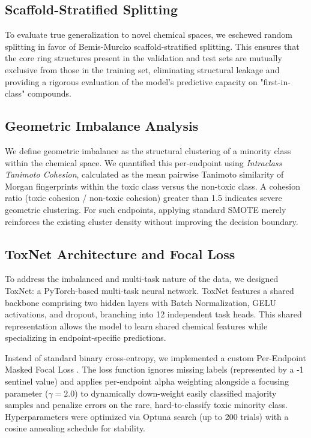 \documentclass[lettersize,journal]{IEEEtran}
\begin{document}
\subsection{Scaffold-Stratified Splitting}
To evaluate true generalization to novel chemical spaces, we eschewed random splitting in favor of Bemis-Murcko scaffold-stratified splitting. This ensures that the core ring structures present in the validation and test sets are mutually exclusive from those in the training set, eliminating structural leakage and providing a rigorous evaluation of the model's predictive capacity on "first-in-class" compounds.

\subsection{Geometric Imbalance Analysis}
We define geometric imbalance as the structural clustering of a minority class within the chemical space. We quantified this per-endpoint using \textit{Intraclass Tanimoto Cohesion}, calculated as the mean pairwise Tanimoto similarity of Morgan fingerprints within the toxic class versus the non-toxic class. A cohesion ratio (toxic cohesion / non-toxic cohesion) greater than 1.5 indicates severe geometric clustering. For such endpoints, applying standard SMOTE merely reinforces the existing cluster density without improving the decision boundary. 

\subsection{ToxNet Architecture and Focal Loss}
To address the imbalanced and multi-task nature of the data, we designed ToxNet: a PyTorch-based multi-task neural network. ToxNet features a shared backbone comprising two hidden layers with Batch Normalization, GELU activations, and dropout, branching into 12 independent task heads. This shared representation allows the model to learn shared chemical features while specializing in endpoint-specific predictions.

Instead of standard binary cross-entropy, we implemented a custom Per-Endpoint Masked Focal Loss \cite{ref3}. The loss function ignores missing labels (represented by a -1 sentinel value) and applies per-endpoint alpha weighting alongside a focusing parameter ($\gamma=2.0$) to dynamically down-weight easily classified majority samples and penalize errors on the rare, hard-to-classify toxic minority class. Hyperparameters were optimized via Optuna search (up to 200 trials) with a cosine annealing schedule for stability.
\end{document}
